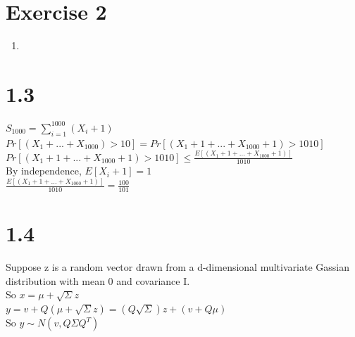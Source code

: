 \documentclass[12pt]{article}
\begin{document}
\section*{Exercise 2}
\begin{enumerate}
	\item
	



\end{enumerate}


\section*{1.3}
$S_{1000} = \sum_{i=1}^{1000}(X_i+1)$\\
$Pr[(X_1+...+X_{1000})>10] = Pr[(X_1+1+...+X_{1000}+1)>1010]$\\
$Pr[(X_1+1+...+X_{1000}+1)>1010] \leq \frac{E[(X_1+1+...+X_{1000}+1)]}{1010}$\\
By independence, $E[X_i+1] = 1$\\
$\frac{E[(X_1+1+...+X_{1000}+1)]}{1010} = \frac{100 }{101}$\\




\section*{1.4}
Suppose z is a random vector drawn from a d-dimensional multivariate Gassian distribution with mean 0 and covariance I.\\
So $x= \mu  + \sqrt{\Sigma  }z$\\
$y= v + Q(\mu  + \sqrt{\Sigma  }z) = (Q\sqrt{\Sigma })z + (v+Q\mu )$\\
So $y\sim N (v ,Q\Sigma Q^T)$\\
\end{document}

